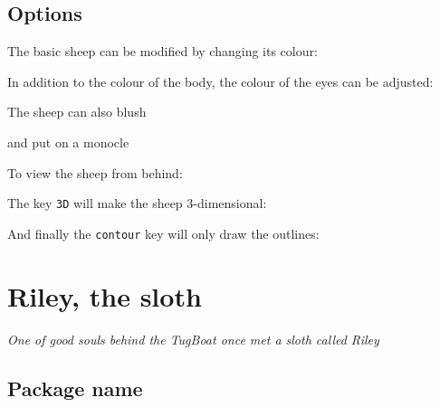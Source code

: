 \documentclass[parskip=half]{scrartcl}
\begin{document}
\begin{tcblisting}{}
\sheep
\end{tcblisting}

\subsection{Options}

The basic sheep can be modified by changing its colour:
\begin{tcblisting}{}
\sheep[body=blue]
\end{tcblisting}

In addition to the colour of the body, the colour of the eyes can be adjusted:
\begin{tcblisting}{}
\sheep[eye=red]
\end{tcblisting}

The sheep can also blush
\begin{tcblisting}{}
\sheep[blush]
\end{tcblisting}

and put on a monocle
\begin{tcblisting}{}
\sheep[monocle]
\end{tcblisting}

To view the sheep from behind:
\begin{tcblisting}{}
\sheep[back]
\end{tcblisting}

The key \lstinline|3D| will make the sheep 3-dimensional:
\begin{tcblisting}{}
\sheep[3D]
\end{tcblisting}

And finally the \lstinline|contour| key will only draw the outlines:
\begin{tcblisting}{}
\sheep[contour=black]
\end{tcblisting}

%
%
\clearpage
\section[Sloth]{Riley, the sloth}

\emph{One of good souls behind the TugBoat once met a sloth called Riley}

\subsection{Package name}
\end{document}
